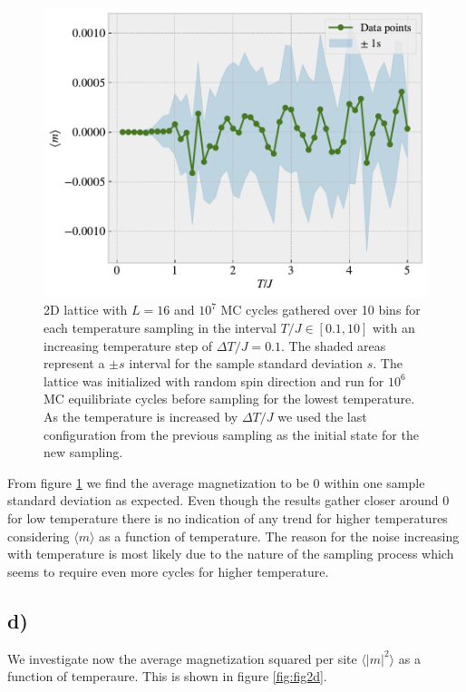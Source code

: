 \documentclass[reprint, amsmath, amssymb, aps, onecolumn]{revtex4-2}
\begin{document}
{{\begin{figure}[H]
  \centering
  \includegraphics[width=0.6\linewidth]{figures/fig2c.pdf}
  \caption{2D lattice with $L = 16$ and $10^7$ MC cycles gathered over 10 bins for each temperature sampling in the interval $T/J \in [0.1, 10]$ with an increasing temperature step of $\Delta T/J = 0.1$. The shaded areas represent a $\pm s$ interval for the sample standard deviation $s$. The lattice was initialized with random spin direction and run for $10^6$ MC equilibriate cycles before sampling for the lowest temperature. As the temperature is increased by $\Delta T/J$ we used the last configuration from the previous sampling as the initial state for the new sampling.}
  \label{fig:fig2c}
\end{figure}

From figure \ref{fig:fig2c} we find the average magnetization to be 0 within one sample standard deviation as expected.  Even though the results gather closer around 0 for low temperature there is no indication of any trend for higher temperatures considering $\langle m \rangle$ as a function of temperature. The reason for the noise increasing with temperature is most likely due to the nature of the sampling process which seems to require even more cycles for higher temperature. 

\clearpage
\subsection*{d)}
\noindent We investigate now the average magnetization squared per site $\langle |m|^2 \rangle$ as a function of temperaure. This is shown in figure \ref{fig:fig2d}.

}}
\end{document}
